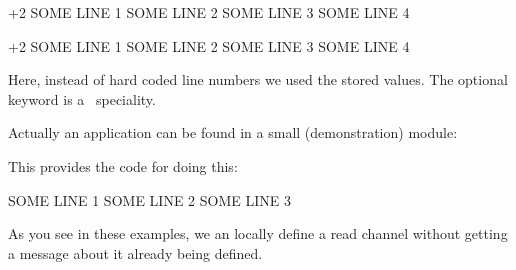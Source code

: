 \starttyping[option=TEX]
\integerdef\StartHere\numexpr{}+2\relax
\starthiding
SOME LINE 1
SOME LINE 2
SOME LINE 3
SOME LINE 4
\stophiding
\integerdef\StopHere\numexpr{}\relax
\stoptyping


\integerdef\StartHere\numexpr{}+2\relax
\starthiding
SOME LINE 1
SOME LINE 2
SOME LINE 3
SOME LINE 4
\stophiding
\integerdef\StopHere\numexpr{}\relax

\startbuffer
\begingroup
  \newlocalread\myreada
  \immediate\openin{}
  \blank
  \immediate\closein\myreada
\endgroup
\stopbuffer

\typebuffer[option=TEX]

Here, instead of hard coded line numbers we used the stored values. The
optional  keyword is a \LMTX\ speciality.

\startlines \getbuffer \stoplines

Actually an application can be found in a small (demonstration) module:

\startbuffer
{}
\stopbuffer

\typebuffer[option=TEX] \getbuffer

This provides the code for doing this:

\starttyping[option=TEX]
\startmarkedlines[test]
SOME LINE 1
SOME LINE 2
SOME LINE 3
\stopmarkedlines

\begingroup
  \newlocalread\myreada
  \immediate\openin{}
  \immediate\closein\myreada
\endgroup
\stoptyping

As you see in these examples, we an locally define a read channel without
getting a message about it already being defined.

\stopsectionlevel

\stopdocument


